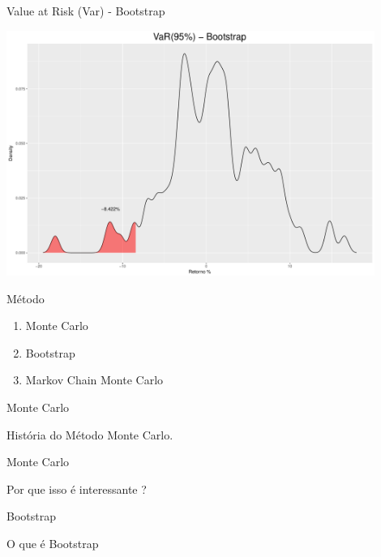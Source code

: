 \documentclass{beamer}
\begin{document}
\begin{frame}{Value at Risk (Var) - Bootstrap}

\begin{center}
 \includegraphics[height=8cm,keepaspectratio]{VAR_boots.pdf}
 \end{center}
 
\end{frame}




\begin{frame}{Método}

\begin{enumerate}
\item Monte Carlo
\item Bootstrap
\item Markov Chain Monte Carlo
\end{enumerate}

\end{frame}



\begin{frame}{Monte Carlo}

História do Método Monte Carlo.

\end{frame}







\begin{frame}{Monte Carlo}

Por que isso é interessante ?

\end{frame}


\begin{frame}{Bootstrap}

O que é Bootstrap

\end{frame}
\end{document}
